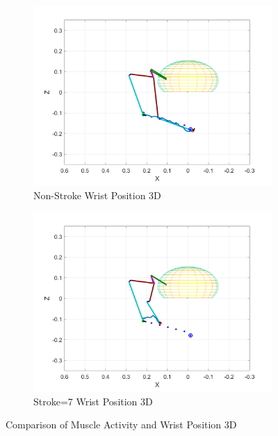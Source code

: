 \begin{figure}[ht]
    \vspace{2pt} %

    \begin{subfigure}[b]{0.45\textwidth}
        \centering
        \includegraphics[width=\linewidth]{Pictures/Results/Controller/Healthy_WP.png}
        \caption{Non-Stroke Wrist Position 3D}
    \end{subfigure}%
    \hfill
    \begin{subfigure}[b]{0.45\textwidth}
        \centering
        \includegraphics[width=\linewidth]{Pictures/Results/Controller/StrokeWithouControl_WP.png}
        \caption{Stroke=7 Wrist Position 3D}
    \end{subfigure}
        
    \caption{Comparison of Muscle Activity and Wrist Position 3D}
    \label{fig: comparisonmuscleactivity}
\end{figure}

